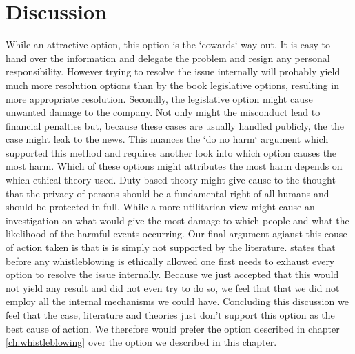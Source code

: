 \section{Discussion}
While an attractive option, this option is the `cowards` way out. It is easy to hand over the information and delegate the problem and resign any personal responsibility. However trying to resolve the issue internally will probably yield much more resolution options than by the book legislative options, resulting in more appropriate resolution.
Secondly, the legislative option might cause unwanted damage to the company. Not only might the misconduct lead to financial penalties but, because these cases are usually handled publicly, the the case might leak to the news. This nuances the `do no harm` argument which supported this method and requires another look into which option causes the most harm. Which of these options might attributes the most harm depends on which ethical theory used. Duty-based theory might give cause to the thought that the privacy of persons should be a fundamental right of all humans and should be protected in full. While a more utilitarian view might cause an investigation on what would give the most damage to which people and what the likelihood of the harmful events occurring.
Our final argument agianst this couse of action taken is that is is simply not supported by the literature. \cite{whistleblowing_paradoxes} states that before any whistleblowing is ethically allowed one first needs to exhaust every option to resolve the issue internally. Because we just accepted that this would not yield any result and did not even try to do so, we feel that that we did not employ all the internal mechanisms we could have.
Concluding this discussion we feel that the case, literature and theories just don't support this option as the best cause of action. We therefore would prefer the option described in chapter \ref{ch:whistleblowing} over the option we described in this chapter.